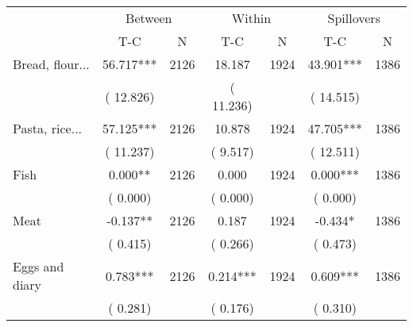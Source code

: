 
\begin{tabular}{l*{6}{c}}\hline&\multicolumn{2}{c}{Between}&\multicolumn{2}{c}{Within}&\multicolumn{2}{c}{Spillovers} \\ \cmidrule(r){2-3}\cmidrule(l){4-5}\cmidrule(l){6-7} & {T-C} & {N} & {T-C} & {N}  & {T-C}  & {N}  \\ \midrule
Bread, flour...        &             56.717***      &       2126       &             18.187      &       1924       &             43.901***      &       1386       \\
                       &       (      12.826)            &                               &       (      11.236)            &                               &       (      14.515)            &                               \\
Pasta, rice...        &             57.125***      &       2126       &             10.878      &       1924       &             47.705***      &       1386       \\
                       &       (      11.237)            &                               &       (       9.517)            &                               &       (      12.511)            &                               \\
Fish        &              0.000**      &       2126       &              0.000      &       1924       &              0.000***      &       1386       \\
                       &       (       0.000)            &                               &       (       0.000)            &                               &       (       0.000)            &                               \\
Meat        &             -0.137**      &       2126       &              0.187      &       1924       &             -0.434*      &       1386       \\
                       &       (       0.415)            &                               &       (       0.266)            &                               &       (       0.473)            &                               \\
Eggs and diary        &              0.783***      &       2126       &              0.214***      &       1924       &              0.609***      &       1386       \\
                       &       (       0.281)            &                               &       (       0.176)            &                               &       (       0.310)            &                               \\

\end{tabular}
